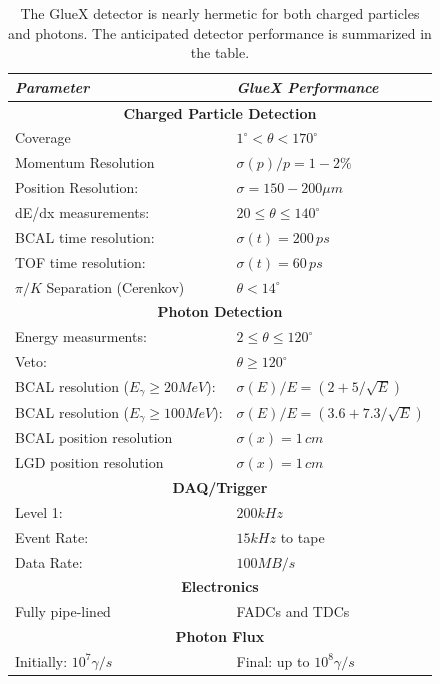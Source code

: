 \begin{table}[t]
\begin{center}
\begin{tabular}{ll}
\hline\hline
{\centering \textbf{\textit{Parameter}}} & 
{\centering \textbf{\textit{GlueX Performance}}} \\
\hline
\multicolumn{2}{c}{\textbf{Charged Particle Detection}} \\
Coverage              & $1^{\circ} < \theta < 170^{\circ}$  \\
Momentum Resolution   & $\sigma(p)/p=1-2\%$ \\    
Position Resolution:  & $\sigma=150-200\mu m$ \\
dE/dx measurements:   & $20\le \theta \le 140^{\circ}$ \\
BCAL time resolution: & $\sigma(t)=200\, ps$ \\
TOF time resolution:  & $\sigma(t)=60\, ps$ \\
$\pi/K$ Separation (Cerenkov) & $\theta < 14^{\circ}$ \\
\multicolumn{2}{c}{\textbf{Photon Detection}} \\
Energy measurments:   & $2\le \theta \le 120^{\circ}$ \\
Veto:                 & $\theta \geq 120^{\circ}$ \\
BCAL resolution ($E_{\gamma}\geq 20 MeV$):  & $\sigma(E)/E=(2+5/\sqrt{E})$ \\
BCAL resolution ($E_{\gamma}\geq 100 MeV$): & $\sigma(E)/E=(3.6+7.3/\sqrt{E})$ \\
BCAL  position resolution & $\sigma(x)=1\, cm$ \\
LGD  position resolution & $\sigma(x)=1\, cm$ \\
\multicolumn{2}{c}{\textbf{DAQ/Trigger}} \\
Level 1:     & $200 kHz$ \\
Event Rate: & $15 kHz$ to tape \\
Data Rate:   & $100 MB/s$ \\
\multicolumn{2}{c}{\textbf{Electronics}} \\
Fully pipe-lined &  FADCs and TDCs \\
\multicolumn{2}{c}{\textbf{Photon Flux}} \\
Initially: $10^{7} \gamma/s$ & Final: up to $10^{8}\gamma/s$ \\
\hline\hline
\end{tabular}
\caption[]{\label{tab:gluex_det}The GlueX detector is
nearly hermetic for both charged particles and photons. The anticipated 
detector performance is summarized in the table.}
\end{center}
\end{table}



